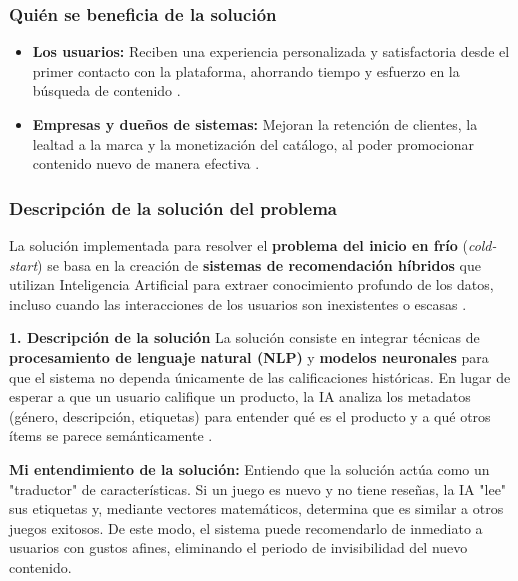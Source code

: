 \documentclass[12pt]{article}
\begin{document}
\subsubsection{Quién se beneficia de la solución}
\begin{itemize}
	\item \textbf{Los usuarios:} Reciben una experiencia personalizada y satisfactoria desde el primer contacto con la plataforma, ahorrando tiempo y esfuerzo en la búsqueda de contenido \cite{DBLP:journals/corr/abs-2005-08148, freecodecamp-cold-start-problem}.
	\item \textbf{Empresas y dueños de sistemas:} Mejoran la retención de clientes, la lealtad a la marca y la monetización del catálogo, al poder promocionar contenido nuevo de manera efectiva \cite{DBLP:journals/corr/abs-2005-08148, freecodecamp-cold-start-problem, Wang_Xu_Li_Li_2025}.
\end{itemize}

\subsubsection{Descripción de la solución del problema}
La solución implementada para resolver el \textbf{problema del inicio en frío} (\emph{cold-start}) se basa en la creación de \textbf{sistemas de recomendación híbridos} que utilizan Inteligencia Artificial para extraer conocimiento profundo de los datos, incluso cuando las interacciones de los usuarios son inexistentes o escasas \cite{DBLP:journals/corr/abs-2005-08148, Wang_Xu_Li_Li_2025}.

\textbf{1. Descripción de la solución}
La solución consiste en integrar técnicas de \textbf{procesamiento de lenguaje natural (NLP)} y \textbf{modelos neuronales} para que el sistema no dependa únicamente de las calificaciones históricas. En lugar de esperar a que un usuario califique un producto, la IA analiza los metadatos (género, descripción, etiquetas) para entender qué es el producto y a qué otros ítems se parece semánticamente \cite{DBLP:journals/corr/abs-2005-08148, freecodecamp-cold-start-problem}.

\textbf{Mi entendimiento de la solución:}
Entiendo que la solución actúa como un "traductor" de características. Si un juego es nuevo y no tiene reseñas, la IA "lee" sus etiquetas y, mediante vectores matemáticos, determina que es similar a otros juegos exitosos. De este modo, el sistema puede recomendarlo de inmediato a usuarios con gustos afines, eliminando el periodo de invisibilidad del nuevo contenido.
\end{document}
